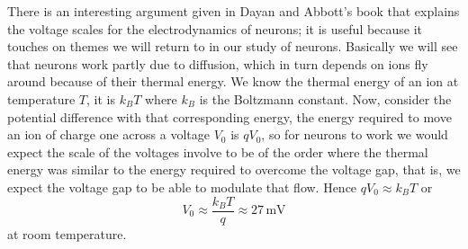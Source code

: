 \documentclass[11pt,a4paper]{scrartcl}
\begin{document}
There is an interesting argument given in Dayan and Abbott's book that
explains the voltage scales for the electrodynamics of neurons; it is
useful because it touches on themes we will return to in our study of
neurons. Basically we will see that neurons work partly due to
diffusion, which in turn depends on ions fly around because of their
thermal energy. We know the thermal energy of an ion at temperature
$T$, it is $k_BT$ where $k_B$ is the Boltzmann constant. Now, consider
the potential difference with that corresponding energy, the energy
required to move an ion of charge one across a voltage $V_0$ is
$qV_0$, so for neurons to work we would expect the scale of the
voltages involve to be of the order where the thermal energy was
similar to the energy required to overcome the voltage gap, that is,
we expect the voltage gap to be able to modulate that flow. Hence
$qV_0\approx k_BT$ or
\begin{equation}
V_0\approx \frac{k_BT}{q}\approx 27\,\mbox{mV}
\end{equation}
at room temperature.
\end{document}
